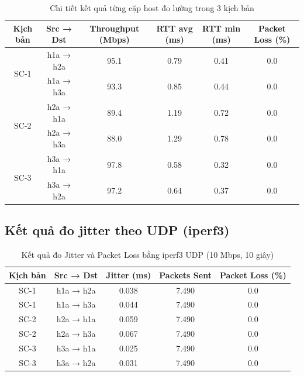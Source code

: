 \begin{table}[htbp]
    \centering
    \caption{Chi tiết kết quả từng cặp host đo lường trong 3 kịch bản}
    \vspace{0.2cm}
    \small
    \begin{tabularx}{\textwidth}{|c|c|c|c|c|c|}
        \hline
        \textbf{Kịch bản} & \textbf{Src → Dst} & \textbf{Throughput (Mbps)} & \textbf{RTT avg (ms)} & \textbf{RTT min (ms)} & \textbf{Packet Loss (\%)} \\ \hline
        \multirow{2}{*}{SC-1} & h1a → h2a & 95.1 & 0.79 & 0.41 & 0.0 \\ \cline{2-6}
                               & h1a → h3a & 93.3 & 0.85 & 0.44 & 0.0 \\ \hline
        \multirow{2}{*}{SC-2} & h2a → h1a & 89.4 & 1.19 & 0.72 & 0.0 \\ \cline{2-6}
                               & h2a → h3a & 88.0 & 1.29 & 0.78 & 0.0 \\ \hline
        \multirow{2}{*}{SC-3} & h3a → h1a & 97.8 & 0.58 & 0.32 & 0.0 \\ \cline{2-6}
                               & h3a → h2a & 97.2 & 0.64 & 0.37 & 0.0 \\ \hline
    \end{tabularx}
\end{table}

\subsection{Kết quả đo jitter theo UDP (iperf3)}

\begin{table}[htbp]
    \centering
    \caption{Kết quả đo Jitter và Packet Loss bằng iperf3 UDP (10 Mbps, 10 giây)}
    \vspace{0.2cm}
    \begin{tabularx}{\textwidth}{|c|c|c|c|c|}
        \hline
        \textbf{Kịch bản} & \textbf{Src → Dst} & \textbf{Jitter (ms)} & \textbf{Packets Sent} & \textbf{Packet Loss (\%)} \\ \hline
        SC-1 & h1a → h2a & 0.038 & 7.490 & 0.0 \\ \hline
        SC-1 & h1a → h3a & 0.044 & 7.490 & 0.0 \\ \hline
        SC-2 & h2a → h1a & 0.059 & 7.490 & 0.0 \\ \hline
        SC-2 & h2a → h3a & 0.067 & 7.490 & 0.0 \\ \hline
        SC-3 & h3a → h1a & 0.025 & 7.490 & 0.0 \\ \hline
        SC-3 & h3a → h2a & 0.031 & 7.490 & 0.0 \\ \hline
    \end{tabularx}
\end{table}

